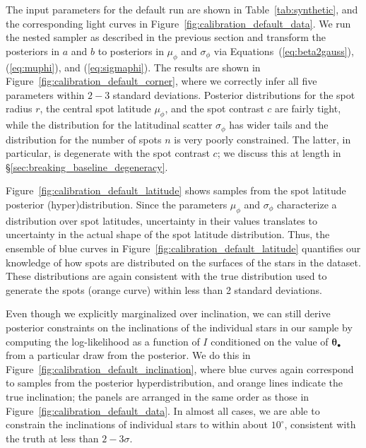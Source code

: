 \documentclass[modern]{aastex62}
\begin{document}
The input parameters for the default run are shown in Table~\ref{tab:synthetic},
and the corresponding light curves in Figure~\ref{fig:calibration_default_data}.
We run the nested sampler as described in the previous section and transform
the posteriors in $a$ and $b$ to posteriors in $\mu_\phi$ and $\sigma_\phi$ via
Equations~(\ref{eq:beta2gauss}), (\ref{eq:muphi}), and (\ref{eq:sigmaphi}).
The results are shown in Figure~\ref{fig:calibration_default_corner}, where
we correctly infer all five parameters within $2-3$ standard deviations.
Posterior distributions for the spot radius $r$, the central spot latitude $\mu_\phi$,
and the spot contrast $c$ are fairly tight, while the distribution for
the latitudinal scatter $\sigma_\phi$ has wider tails and the distribution for
the number of spots $n$ is very poorly constrained. The latter, in particular, is
degenerate with the spot contrast $c$; we discuss this at length in
\S\ref{sec:breaking_baseline_degeneracy}.

Figure~\ref{fig:calibration_default_latitude} shows samples from the spot
latitude posterior (hyper)distribution. Since the parameters $\mu_\phi$
and $\sigma_\phi$ characterize a distribution over spot latitudes, uncertainty
in their values translates to uncertainty in the actual shape of the spot
latitude distribution. Thus, the ensemble of blue curves in
Figure~\ref{fig:calibration_default_latitude} quantifies our knowledge of
how spots are distributed on the surfaces of the stars in the dataset.
These distributions are again consistent with the true distribution used
to generate the spots (orange curve) within less than 2 standard deviations.

Even though we explicitly marginalized over inclination, we can still
derive posterior constraints on the inclinations of the individual stars in
our sample by computing the log-likelihood as a function of $I$
conditioned on the value of $\pmb{\theta}_\bullet$ from a particular draw from
the posterior. We do this in Figure~\ref{fig:calibration_default_inclination},
where blue curves again correspond to samples from the posterior hyperdistribution,
and orange lines indicate the true inclination; the panels are arranged in the
same order as those in Figure~\ref{fig:calibration_default_data}.
In almost all cases, we are able to constrain the inclinations of individual
stars to within about $10^\circ$, consistent with the truth at less than
$2{-}3\sigma$.
\end{document}

